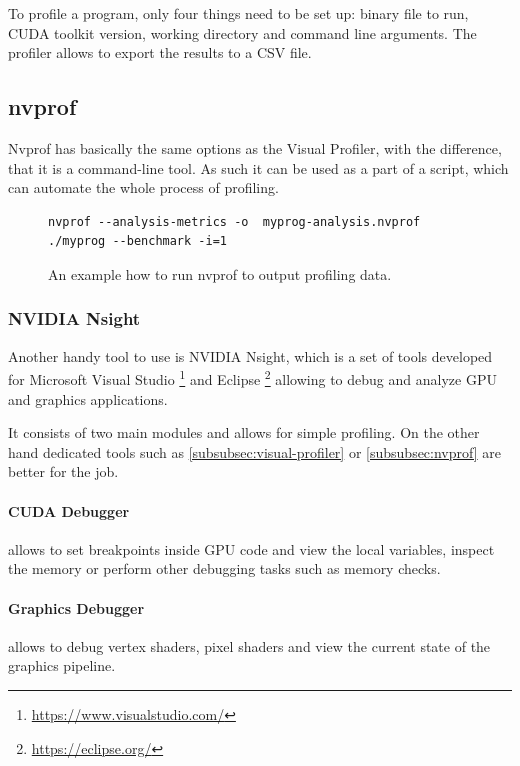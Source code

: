 To profile a program, only four things need to be set up: binary file to run, CUDA toolkit version, working directory and command line arguments. The profiler allows to export the results to a CSV file.

\subsection{nvprof}\label{subsec:proftools-nvprof}

Nvprof has basically the same options as the Visual Profiler, with the difference, that it is a command-line tool. As such it can be used as a part of a script, which can automate the whole process of profiling.

\begin{figure}
\begin{verbatim}
nvprof --analysis-metrics -o  myprog-analysis.nvprof ./myprog --benchmark -i=1
\end{verbatim}
\caption{An example how to run nvprof to output profiling data.}
\end{figure}

\subsubsection{NVIDIA Nsight}\label{subsec:proftools-nsight}

Another handy tool to use is NVIDIA Nsight, which is a set of tools developed for Microsoft Visual Studio \footnote{\url{https://www.visualstudio.com/}} and Eclipse \footnote{\url{https://eclipse.org/}} allowing to debug and analyze GPU and graphics applications.

It consists of two main modules and allows for simple profiling. On the other hand dedicated tools such as \ref{subsubsec:visual-profiler} or \ref{subsubsec:nvprof} are better for the job.

\paragraph{CUDA Debugger} allows to set breakpoints inside GPU code and view the local variables, inspect the memory or perform other debugging tasks such as memory checks.

\paragraph{Graphics Debugger} allows to debug vertex shaders, pixel shaders and view the current state of the graphics pipeline.

